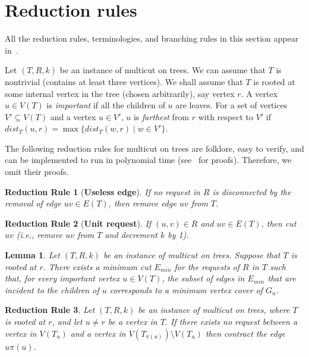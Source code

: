 \documentclass[11pt]{article}
\newtheorem{lemma}[theorem]{Lemma}
\newtheorem{reduction}{Reduction Rule}[section]
\begin{document}
\section{Reduction rules}
\label{sec:structure}

All the reduction rules, terminologies, and branching rules in this section appear in~\cite{multicut}.

Let $(T, R, k)$ be an instance of {\sc multicut on trees}. We can assume that $T$ is nontrivial (contains at least three vertices). We shall assume that $T$ is rooted at some internal vertex in the tree (chosen arbitrarily), say vertex $r$. A vertex $u \in V(T)$ is {\em important} if all the children of $u$ are leaves. For a set of vertices $V' \subseteq V(T)$ and a vertex $u \in V'$, $u$ is {\em farthest} from $r$ with respect to $V'$ if $dist_T(u, r) = \max\{dist_T(w, r) \mid w \in V'\}$.

The following reduction rules for {\sc multicut on trees} are folklore, easy to verify, and can be implemented to run in polynomial time (see~\cite{thomase,guo} for proofs). Therefore, we omit their proofs.

\begin{reduction} [{\bf Useless edge}]
\label{red:0.1}
If no request in $R$ is disconnected by the removal of edge $uv \in E(T)$, then remove edge $uv$ from $T$.
\end{reduction}


\begin{reduction} [{\bf Unit request}]
\label{red:0.3}
If $(u,v) \in R$ and $uv \in E(T)$, then cut $uv$ (i.e., remove $uv$ from $T$ and decrement $k$ by 1).
\end{reduction}



\begin{lemma}
\label{lem:minvc}
Let $(T, R, k)$ be an instance of {\sc multicut on trees}. Suppose that $T$ is rooted at $r$. There exists a minimum cut $E_{min}$ for the requests of $R$ in $T$ such that, for every important vertex $u \in V(T)$, the subset of edges in $E_{min}$ that are incident to the children of $u$ corresponds to a minimum vertex cover of $G_u$.
\end{lemma}



\begin{reduction}\label{red:3}
Let $(T, R, k)$ be an instance of {\sc multicut on trees}, where $T$ is rooted at $r$, and let $u \neq r$ be a vertex in $T$.  If there exists no request between a vertex in $V(T_u)$ and a vertex in $V(T_{\pi(u)}) \setminus V(T_u)$ then contract the edge $u\pi(u)$.
\end{reduction}
\end{document}
